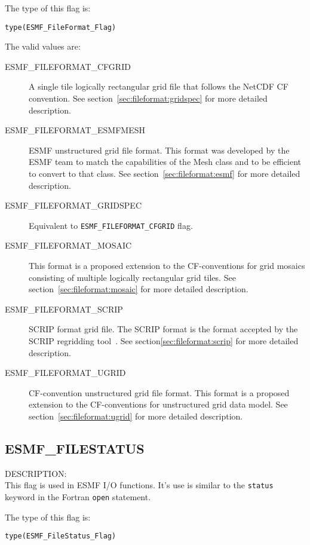 The type of this flag is:

{\tt type(ESMF\_FileFormat\_Flag)}

The valid values are:
\begin{description}
\item [ESMF\_FILEFORMAT\_CFGRID]  A single tile logically rectangular
  grid file that follows the NetCDF CF convention. See section~\ref{sec:fileformat:gridspec} for more detailed description.

\item [ESMF\_FILEFORMAT\_ESMFMESH] ESMF unstructured grid file format. This format was developed by the ESMF team to match the capabilities of the Mesh class and to be efficient to convert to that class. See section~\ref{sec:fileformat:esmf} for more detailed description.

\item [ESMF\_FILEFORMAT\_GRIDSPEC]  Equivalent to {\tt ESMF\_FILEFORMAT\_CFGRID} flag.  

\item [ESMF\_FILEFORMAT\_MOSAIC] This format is a proposed extension to the 
CF-conventions for grid mosaics consisting of multiple logically rectangular grid
tiles. See section~\ref{sec:fileformat:mosaic} for more detailed description.

\item [ESMF\_FILEFORMAT\_SCRIP] SCRIP format grid file. The SCRIP format is
  the format accepted by the SCRIP regridding tool~\cite{ref:SCRIP}.  See section\ref{sec:fileformat:scrip} for more detailed description.

\item [ESMF\_FILEFORMAT\_UGRID] CF-convention unstructured grid file format. This format is a proposed extension to the 
CF-conventions for unstructured grid data model. See section~\ref{sec:fileformat:ugrid} for more detailed description.

\end{description}

\subsection{ESMF\_FILESTATUS}
\label{const:filestatusflag}
{\sf DESCRIPTION:\\}
This flag is used in ESMF I/O functions. It's use is similar to the
{\tt status} keyword in the Fortran {\tt open} statement.

The type of this flag is:

{\tt type(ESMF\_FileStatus\_Flag)}

